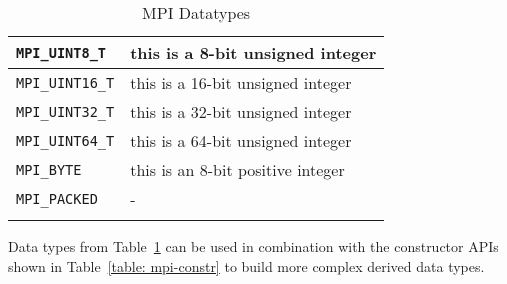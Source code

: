 \begin{longtable}{|>{\centering\arraybackslash} m{5.5cm} | >{\centering\arraybackslash} m{6cm} |}
        \small \texttt{MPI\_UINT8\_T}                 & \small this is a 8-bit unsigned integer                                                       \\ \hline
        \small \texttt{MPI\_UINT16\_T}                & \small this is a 16-bit unsigned integer                                                      \\ \hline
        \small \texttt{MPI\_UINT32\_T}                & \small this is a 32-bit unsigned integer                                                      \\ \hline
        \small \texttt{MPI\_UINT64\_T}                & \small this is a 64-bit unsigned integer                                                      \\ \hline
        \small \texttt{MPI\_BYTE}                     & \small this is an 8-bit positive integer                                                      \\ \hline
        \small \texttt{MPI\_PACKED}                   & -                                                                                             \\ \hline
        \caption{MPI Datatypes}
        \label{table: mpi-types}
\end{longtable}

Data types from Table~\ref{table: mpi-types} can be used in combination with the constructor APIs shown in Table~\ref{table: mpi-constr} to build more complex derived data types.

